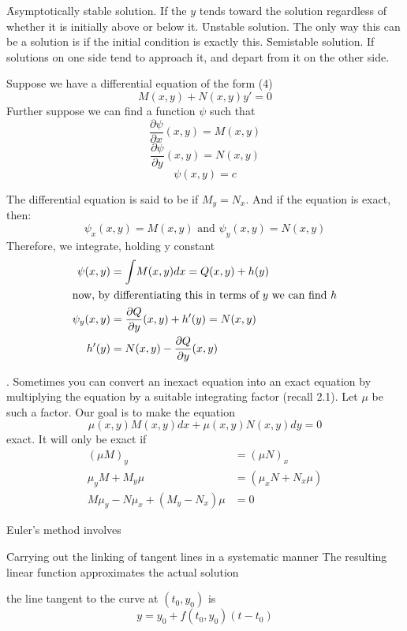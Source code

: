 \begin{itemize}
\f Asymptotically stable solution. If the $y$ tends toward the solution regardless of whether it is initially above or below it.
\f Unstable solution. The only way this can be a solution is if the initial condition is exactly this.
\f Semistable solution. If solutions on one side tend to approach it, and depart from it on the other side.
\end{itemize}

Suppose we have a differential equation of the form (4)
$$M(x,y) + N(x,y)y' = 0$$
Further suppose we can find a function $\psi$ such that 
$$\frac{\partial \psi}{\partial x}(x,y) = M(x,y)$$
$$\frac{\partial \psi}{\partial y}(x,y) = N(x,y)$$
$$\psi(x,y) = c$$

The differential equation is said to be  if $M_y = N_x$. And if the equation is exact, then:
$$\psi_x(x,y) = M(x,y) \text{ and } \psi_y(x,y) = N(x,y)$$
Therefore, we integrate, holding y constant
\begin{align*}
\psi(x,y) &= \int \! M(x,y)dx = Q(x,y) + h(y)\\
\intertext{now, by differentiating this in terms of $y$ we can find $h$}
\psi_y(x,y) &= \frac{\partial Q}{\partial y}(x,y) + h'(y) = N(x,y)\\
h'(y) &= N(x,y) - \frac{\partial Q}{\partial y}(x,y)
\end{align*}

. Sometimes you can convert an inexact equation into an exact equation by multiplying the equation by a suitable integrating factor (recall 2.1). Let $\mu$ be such a factor. Our goal is to make the equation
$$ \mu(x,y)M(x,y)dx + \mu(x,y)N(x,y)dy = 0$$
exact. It will only be exact if 
\begin{align*}
(\mu M)_y &= (\mu N)_x\\
\mu_yM + M_y\mu &= (\mu_xN + N_x\mu)\\
M\mu_y - N\mu_x + (M_y - N_x)\mu &= 0 
\end{align*}

Euler's method involves
\begin{itemize}
\f Carrying out the linking of tangent lines in a systematic manner
\f The resulting linear function approximates the actual solution
\end{itemize}

the line tangent to the curve at $(t_0, y_0)$ is 
$$y = y_0 + f(t_0,y_0)(t - t_0)
$$